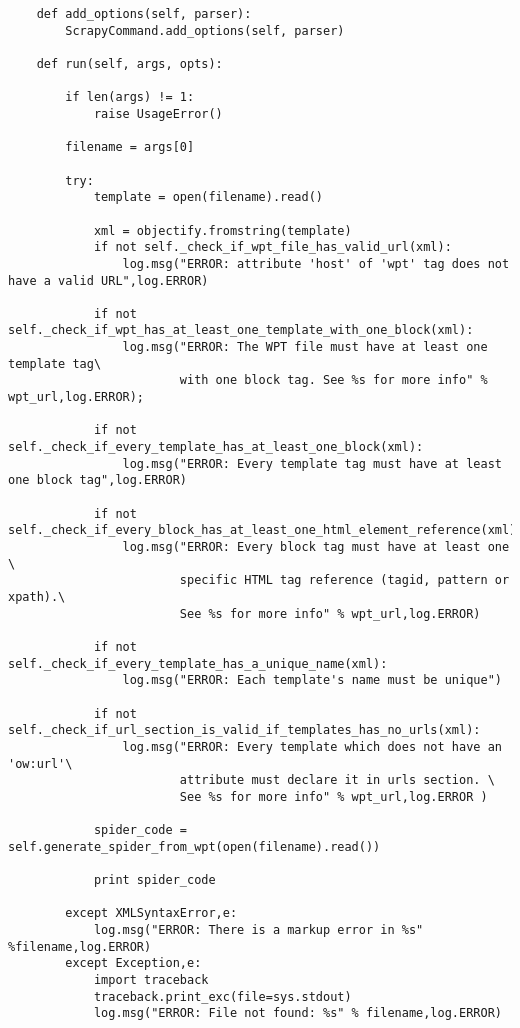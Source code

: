 \begin{lstlisting}
    def add_options(self, parser):
        ScrapyCommand.add_options(self, parser)

    def run(self, args, opts):

        if len(args) != 1:
            raise UsageError()

        filename = args[0]

        try:
            template = open(filename).read()

            xml = objectify.fromstring(template)
            if not self._check_if_wpt_file_has_valid_url(xml):
                log.msg("ERROR: attribute 'host' of 'wpt' tag does not have a valid URL",log.ERROR)

            if not self._check_if_wpt_has_at_least_one_template_with_one_block(xml):
                log.msg("ERROR: The WPT file must have at least one template tag\
                        with one block tag. See %s for more info" % wpt_url,log.ERROR);
    
            if not self._check_if_every_template_has_at_least_one_block(xml):
                log.msg("ERROR: Every template tag must have at least one block tag",log.ERROR)
    
            if not self._check_if_every_block_has_at_least_one_html_element_reference(xml):
                log.msg("ERROR: Every block tag must have at least one \
                        specific HTML tag reference (tagid, pattern or xpath).\
                        See %s for more info" % wpt_url,log.ERROR)

            if not self._check_if_every_template_has_a_unique_name(xml):
                log.msg("ERROR: Each template's name must be unique")
            
            if not self._check_if_url_section_is_valid_if_templates_has_no_urls(xml):
                log.msg("ERROR: Every template which does not have an 'ow:url'\
                        attribute must declare it in urls section. \
                        See %s for more info" % wpt_url,log.ERROR )
            
            spider_code = self.generate_spider_from_wpt(open(filename).read())

            print spider_code

        except XMLSyntaxError,e:
            log.msg("ERROR: There is a markup error in %s" %filename,log.ERROR)
        except Exception,e:
            import traceback
            traceback.print_exc(file=sys.stdout)
            log.msg("ERROR: File not found: %s" % filename,log.ERROR)
       

\end{lstlisting}
